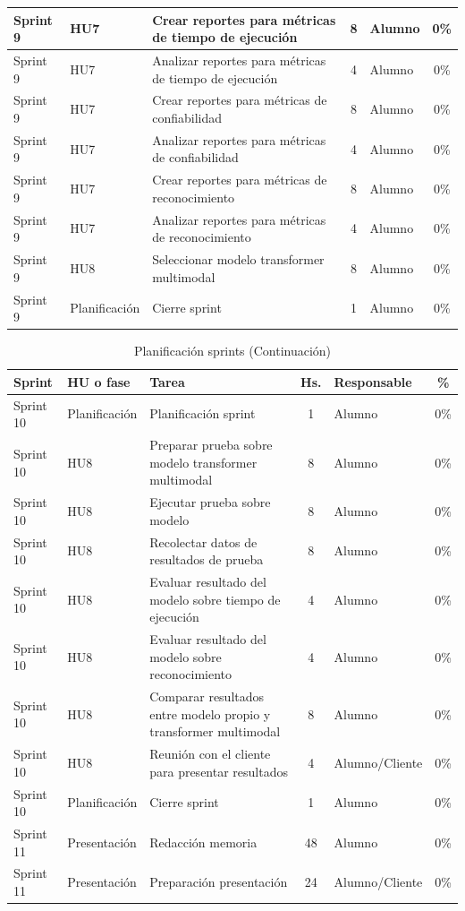\documentclass[
11pt, %
]{charter}
\begin{document}
\begin{table}[htpb]
\begin{tabularx}{\linewidth}{@{}|l|l|X|c|l|c|@{}}
Sprint 9	&	HU7	&	Crear reportes para métricas de tiempo de ejecución	&	8	&	Alumno	&	0\%	\\ \hline
Sprint 9	&	HU7	&	Analizar reportes para métricas de tiempo de ejecución	&	4	&	Alumno	&	0\%	\\ \hline
Sprint 9	&	HU7	&	Crear reportes para métricas de confiabilidad	&	8	&	Alumno	&	0\%	\\ \hline
Sprint 9	&	HU7	&	Analizar reportes para métricas de confiabilidad	&	4	&	Alumno	&	0\%	\\ \hline
Sprint 9	&	HU7	&	Crear reportes para métricas de reconocimiento	&	8	&	Alumno	&	0\%	\\ \hline
Sprint 9	&	HU7	&	Analizar reportes para métricas de reconocimiento	&	4	&	Alumno	&	0\%	\\ \hline
Sprint 9	&	HU8	&	Seleccionar modelo transformer multimodal	&	8	&	Alumno	&	0\%	\\ \hline
Sprint 9	&	Planificación	&	Cierre sprint	&	1	&	Alumno	&	0\%	\\ \hline

\end{tabularx}
\end{table}
\begin{table}[htpb]
\centering
\caption{Planificación sprints (Continuación)}
\begin{tabularx}{\linewidth}{@{}|l|l|X|c|l|c|@{}}
\hline
\rowcolor[HTML]{C0C0C0}
Sprint	&	HU o fase	&	Tarea	&	Hs.	&	Responsable	&	\%	\\ \hline

Sprint 10	&	Planificación	&	Planificación sprint	&	1	&	Alumno	&	0\%	\\ \hline
Sprint 10	&	HU8	&	Preparar prueba sobre modelo transformer multimodal	&	8	&	Alumno	&	0\%	\\ \hline
Sprint 10	&	HU8	&	Ejecutar prueba sobre modelo	&	8	&	Alumno	&	0\%	\\ \hline
Sprint 10	&	HU8	&	Recolectar datos de resultados de prueba	&	8	&	Alumno	&	0\%	\\ \hline
Sprint 10	&	HU8	&	Evaluar resultado del modelo sobre tiempo de ejecución	&	4	&	Alumno	&	0\%	\\ \hline
Sprint 10	&	HU8	&	Evaluar resultado del modelo sobre reconocimiento	&	4	&	Alumno	&	0\%	\\ \hline
Sprint 10	&	HU8	&	Comparar resultados entre modelo propio y transformer multimodal	&	8	&	Alumno	&	0\%	\\ \hline
Sprint 10	&	HU8	&	Reunión con el cliente para presentar resultados	&	4	&	Alumno/Cliente	&	0\%	\\ \hline
Sprint 10	&	Planificación	&	Cierre sprint	&	1	&	Alumno	&	0\%	\\ \hline
Sprint 11	&	Presentación	&	Redacción memoria	&	48	&	Alumno	&	0\%	\\ \hline
Sprint 11	&	Presentación	&	Preparación presentación	&	24	&	Alumno/Cliente	&	0\%	\\ \hline

\end{tabularx}
\end{table}
\end{document}

